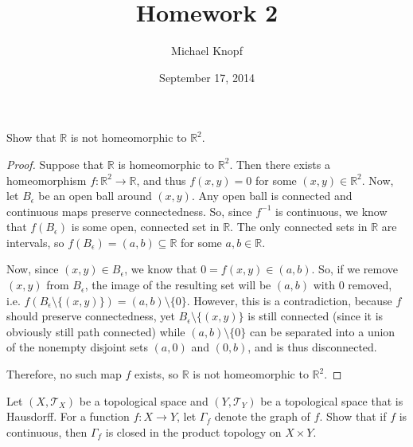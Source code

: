 \documentclass[12pt]{article}
\newcommand{\R}{\mathbb{R}}
\newcommand{\T}{\mathcal{T}}
\newenvironment{exercise}[2][Exercise]{\begin{trivlist}
\item[\hskip \labelsep {\bfseries #1}\hskip \labelsep {\bfseries #2.}]}{\end{trivlist}}
\begin{document}
 
 
\title{Homework 2}
\author{Michael Knopf}
\date{September 17, 2014}
 
\maketitle

\begin{exercise}{3}

Show that $\mathbb{R}$ is not homeomorphic to $\mathbb{R}^2$.

\end{exercise}

\begin{proof}

Suppose that $\mathbb{R}$ is homeomorphic to $\mathbb{R}^2$.  Then there exists a homeomorphism $f:\R^2 \to \R$, and thus $f(x,y) = 0$ for some $(x,y) \in \R^2$.  Now, let $B_\epsilon$ be an open ball around $(x,y)$.  Any open ball is connected and continuous maps preserve connectedness.  So, since $f^{-1}$ is continuous, we know that $f(B_\epsilon)$ is some open, connected set in $\R$.  The only connected sets in $\R$ are intervals, so $f(B_\epsilon) = (a,b) \subseteq \R$ for some $a,b \in \R$.

Now, since $(x,y) \in B_\epsilon$, we know that $0 = f(x,y) \in (a,b)$.  So, if we remove $(x,y)$ from $B_\epsilon$, the image of the resulting set will be $(a,b)$ with $0$ removed, i.e. $f(B_\epsilon \setminus \{ (x,y) \}) = (a,b) \setminus \{ 0 \}$.  However, this is a contradiction, because $f$ should preserve connectedness, yet $B_\epsilon \setminus \{ (x,y) \}$ is still connected (since it is obviously still path connected) while $(a,b) \setminus \{ 0 \}$ can be separated into a union of the nonempty disjoint sets $(a,0)$ and $(0,b)$, and is thus disconnected.

Therefore, no such map $f$ exists, so $\R$ is not homeomorphic to $\R^2$.

\end{proof}

\begin{exercise}{4}

Let $(X, \T_X)$ be a topological space and $(Y, \T_Y)$ be a topological space that is Hausdorff.  For a function $f: X \to Y$, let $\Gamma_f$ denote the graph of $f$.  Show that if $f$ is continuous, then $\Gamma_f$ is closed in the product topology on $X \times Y$.

\end{exercise}
\end{document}
